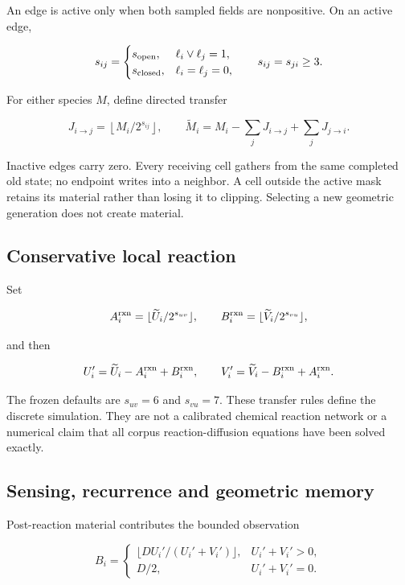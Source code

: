 \documentclass[11pt,a4paper]{article}
\begin{document}
An edge is active only when both sampled fields are nonpositive. On an
active edge,

\[
s_{ij}=\begin{cases}
s_{\rm open},&\ell_i\lor\ell_j=1,\\
s_{\rm closed},&\ell_i=\ell_j=0,
\end{cases}
\qquad s_{ij}=s_{ji}\ge3.
\]

For either species \(M\), define directed transfer

\[
J_{i\to j}=\left\lfloor M_i/2^{s_{ij}}\right\rfloor,
\qquad
\widetilde M_i=M_i-\sum_jJ_{i\to j}+\sum_jJ_{j\to i}.
\]

Inactive edges carry zero. Every receiving cell gathers from the same
completed old state; no endpoint writes into a neighbor. A cell outside
the active mask retains its material rather than losing it to clipping.
Selecting a new geometric generation does not create material.

\subsection{Conservative local
reaction}\label{conservative-local-reaction}

Set

\[
A_i^{\rm rxn}=\lfloor\widetilde U_i/2^{s_{uv}}\rfloor,
\qquad B_i^{\rm rxn}=\lfloor\widetilde V_i/2^{s_{vu}}\rfloor,
\]

and then

\[
U_i'=\widetilde U_i-A_i^{\rm rxn}+B_i^{\rm rxn},\qquad
V_i'=\widetilde V_i-B_i^{\rm rxn}+A_i^{\rm rxn}.
\]

The frozen defaults are \(s_{uv}=6\) and \(s_{vu}=7\). These transfer
rules define the discrete simulation. They are not a calibrated chemical
reaction network or a numerical claim that all corpus reaction-diffusion
equations have been solved exactly.

\subsection{Sensing, recurrence and geometric
memory}\label{sensing-recurrence-and-geometric-memory}

Post-reaction material contributes the bounded observation

\[
B_i=\begin{cases}
\lfloor D U_i'/(U_i'+V_i')\rfloor,& U_i'+V_i'>0,\\
D/2,& U_i'+V_i'=0.
\end{cases}
\]
\end{document}
